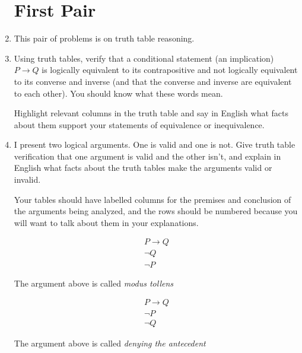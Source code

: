 \documentclass[12pt]{article}
\begin{document}
\begin{enumerate}

\section{First Pair}

\item[]This pair of problems is on truth table reasoning.

\item  Using truth tables, verify that a conditional statement (an implication) $P \rightarrow Q$  is logically equivalent to its contrapositive and not logically equivalent to its converse and inverse (and that the converse and inverse are equivalent to each other).  You should know what these words mean.

Highlight relevant columns in the truth table and say in English what facts about them support your statements of equivalence or inequivalence.

\newpage

\item  I present two logical arguments.  One is valid and one is not.  Give truth table verification that one argument is valid and the other isn't, and explain in English what facts about the truth tables make the arguments valid or invalid.

Your tables should have labelled columns for the premises and conclusion of the arguments being analyzed, and the rows should be numbered because you will want to talk about them in your explanations.

$$\begin{array}{c}

P \rightarrow Q \\

\neg Q \\ \hline

\neg P\end{array}$$

The argument above is called {\em modus tollens\/}

$$\begin{array}{c}

P \rightarrow Q \\

\neg P \\ \hline

\neg Q\end{array}$$

The argument above is called {\em denying the antecedent\/}


\end{enumerate}
\end{document}
